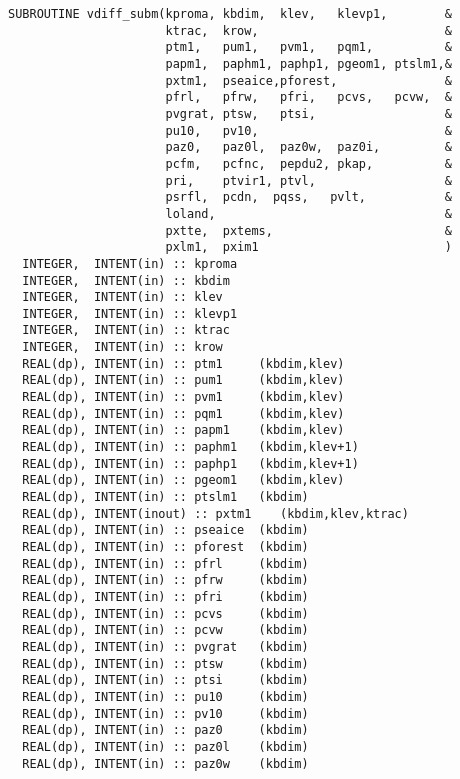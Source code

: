 \begin{lstlisting}[caption=vdiff\_subm]
SUBROUTINE vdiff_subm(kproma, kbdim,  klev,   klevp1,        &
                      ktrac,  krow,                          &
                      ptm1,   pum1,   pvm1,   pqm1,          &
                      papm1,  paphm1, paphp1, pgeom1, ptslm1,&
                      pxtm1,  pseaice,pforest,               &
                      pfrl,   pfrw,   pfri,   pcvs,   pcvw,  &
                      pvgrat, ptsw,   ptsi,                  &
                      pu10,   pv10,                          &
                      paz0,   paz0l,  paz0w,  paz0i,         &
                      pcfm,   pcfnc,  pepdu2, pkap,          &
                      pri,    ptvir1, ptvl,                  &
                      psrfl,  pcdn,  pqss,   pvlt,           &
                      loland,                                &
                      pxtte,  pxtems,                        &
                      pxlm1,  pxim1                          )
  INTEGER,  INTENT(in) :: kproma
  INTEGER,  INTENT(in) :: kbdim                      
  INTEGER,  INTENT(in) :: klev                       
  INTEGER,  INTENT(in) :: klevp1                     
  INTEGER,  INTENT(in) :: ktrac                      
  INTEGER,  INTENT(in) :: krow                       
  REAL(dp), INTENT(in) :: ptm1     (kbdim,klev)      
  REAL(dp), INTENT(in) :: pum1     (kbdim,klev)      
  REAL(dp), INTENT(in) :: pvm1     (kbdim,klev)      
  REAL(dp), INTENT(in) :: pqm1     (kbdim,klev)      
  REAL(dp), INTENT(in) :: papm1    (kbdim,klev)      
  REAL(dp), INTENT(in) :: paphm1   (kbdim,klev+1)    
  REAL(dp), INTENT(in) :: paphp1   (kbdim,klev+1)    
  REAL(dp), INTENT(in) :: pgeom1   (kbdim,klev)      
  REAL(dp), INTENT(in) :: ptslm1   (kbdim)           
  REAL(dp), INTENT(inout) :: pxtm1    (kbdim,klev,ktrac)
  REAL(dp), INTENT(in) :: pseaice  (kbdim)         
  REAL(dp), INTENT(in) :: pforest  (kbdim)         
  REAL(dp), INTENT(in) :: pfrl     (kbdim)         
  REAL(dp), INTENT(in) :: pfrw     (kbdim)         
  REAL(dp), INTENT(in) :: pfri     (kbdim)         
  REAL(dp), INTENT(in) :: pcvs     (kbdim)         
  REAL(dp), INTENT(in) :: pcvw     (kbdim)         
  REAL(dp), INTENT(in) :: pvgrat   (kbdim)         
  REAL(dp), INTENT(in) :: ptsw     (kbdim)         
  REAL(dp), INTENT(in) :: ptsi     (kbdim)         
  REAL(dp), INTENT(in) :: pu10     (kbdim)         
  REAL(dp), INTENT(in) :: pv10     (kbdim)         
  REAL(dp), INTENT(in) :: paz0     (kbdim)         
  REAL(dp), INTENT(in) :: paz0l    (kbdim)         
  REAL(dp), INTENT(in) :: paz0w    (kbdim)         

\end{lstlisting}
